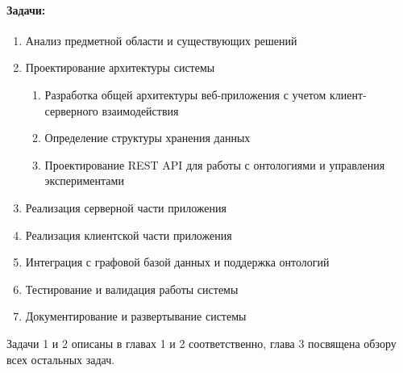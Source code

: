 \paragraph*{Задачи:}
\begin{enumerate}
    \item Анализ предметной области и существующих решений
    \item Проектирование архитектуры системы
    \begin{enumerate}[label=\arabic{enumi}.\arabic*.]
        \item Разработка общей архитектуры веб-приложения с учетом клиент-серверного взаимодействия
        \item Определение структуры хранения данных
        \item Проектирование REST API для работы с онтологиями и управления экспериментами
    \end{enumerate}
    \item Реализация серверной части приложения
    \item Реализация клиентской части приложения
    \item Интеграция с графовой базой данных и поддержка онтологий
    \item Тестирование и валидация работы системы
    \item Документирование и развертывание системы
\end{enumerate}

Задачи 1 и 2 описаны в главах 1 и 2 соответственно, глава 3 посвящена обзору всех остальных задач.
